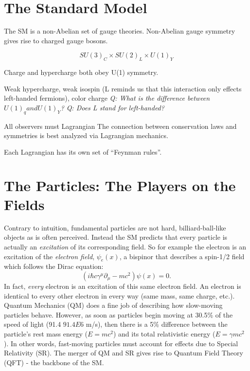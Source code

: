 
\section{The Standard Model}
\label{sec:sm}

The SM is a non-Abelian set of gauge theories.
Non-Abelian gauge symmetry gives rise to charged gauge bosons.

$$SU(3)_C \times SU(2)_L \times U(1)_Y$$

Charge and hypercharge both obey U(1) symmetry.

Weak hypercharge, weak isospin (L reminds us that this interaction only effects left-handed fermions), color charge
\textit{Q: What is the difference between $U(1)_q and U(1)_Y$?}
\textit{Q: Does L stand for left-handed?}

All observers must Lagrangian 
The connection between conservation laws and symmetries is best analyzed via Lagrangian mechanics.

Each Lagrangian has its own set of ``Feynman rules''.

\section{The Particles: The Players on the Fields}

Contrary to intuition, fundamental particles are not hard, billiard-ball-like objects as is often perceived.
Instead the SM predicts that every particle is actually an \emph{excitation} of its corresponding field.
So for example the electron is an excitation of the \emph{electron field}, $\psi_{e}(x)$, a bispinor that describes a spin-1/2 field which follows the Dirac equation: 
\begin{equation*}
    (i\hbar c \gamma^{\mu}{\partial}_{\mu} 
    - mc^{2})\psi(x) = 0.
\end{equation*}
In fact, \emph{every} electron is an excitation of this same electron field. 
An electron is identical to every other electron in every way (same mass, same charge, etc.).
Quantum Mechanics (QM) does a fine job of describing how slow-moving particles behave.
However, as soon as particles begin moving at 30.5\% of the speed of light (91.4 $91.4 E6$ m/s), then there is a 5\% difference between the particle's rest mass energy ($E = mc^2$) and its total relativistic energy ($E = \gamma mc^2$).
In other words, fast-moving particles must account for effects due to Special Relativity (SR).
The merger of QM and SR gives rise to Quantum Field Theory (QFT) - the backbone of the SM.

